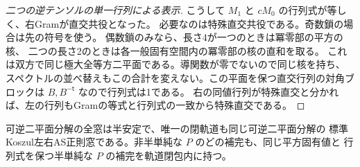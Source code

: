 \begin{proof}[二つの逆テンソルの単一行列による表示]
こうして $M_1$ と $cM_0$ の行列式が等しく、右Gramが直交共役となった。
必要なのは特殊直交共役である。奇数鎖の場合は先の符号を使う。
偶数鎖のみなら、長さ4が一つのときは冪零部の平方の核、
二つの長さ2のときは各一般固有空間内の冪零部の核の直和を取る。
これは双方で同じ極大全等方二平面である。導関数が零でないので同じ核を持ち、
スペクトルの並べ替えもこの合計を変えない。この平面を保つ直交行列の対角ブロックは
$B,B^{-\mathsf t}$ なので行列式は1である。
右の同値行列が特殊直交と分かれば、左の行列もGramの等式と行列式の一致から特殊直交である。
\end{proof}

\begin{theorem}\label{thm:split-polystable-good-limits}
可逆二平面分解の全窓は半安定で、唯一の閉軌道も同じ可逆二平面分解の
標準Koszul左右AS正則窓である。非半単純な $P$ のどの補完も、同じ平方固有値と
行列式を保つ半単純な $P$ の補完を軌道閉包内に持つ。
\end{theorem}
